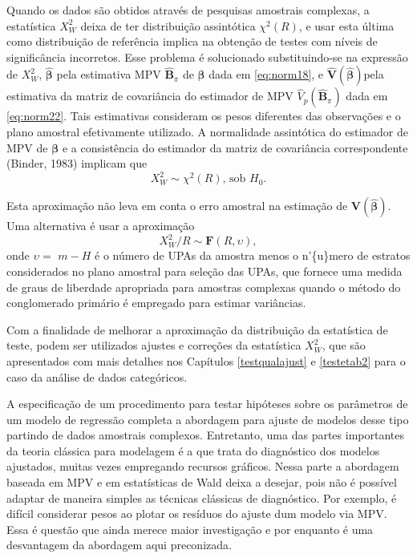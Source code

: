 \documentclass[]{book}
\theoremstyle{definition}
\theoremstyle{definition}
\theoremstyle{definition}
\theoremstyle{remark}
\begin{document}
Quando os dados são obtidos através de pesquisas amostrais complexas, a
estatística \(X_{W}^{2}\) deixa de ter distribuição assintótica
\(\chi ^{2}\left( R\right)\), e usar esta última como distribuição de
referência implica na obtenção de testes com níveis de significância
incorretos. Esse problema é solucionado substituindo-se na expressão de
\(X_{W}^{2}\), \(\mathbf{\hat{\beta}}\) pela estimativa MPV
\(\widehat{\mathbf{B}}_{\pi }\) de \(\mathbf{\beta}\) dada em
\eqref{eq:norm18}, e
\(\widehat{\mathbf{V}}\left( \mathbf{\hat{\beta}}\right)\)pela
estimativa da matriz de covariância do estimador de MPV
\(\hat{V}_{p}\left( \widehat{\mathbf{B}}_{\pi }\right)\) dada em
\eqref{eq:norm22}. Tais estimativas consideram os pesos diferentes das
observações e o plano amostral efetivamente utilizado. A normalidade
assintótica do estimador de MPV de \(\mathbf{\beta}\) e a consistência
do estimador da matriz de covariância correspondente (Binder, 1983)
implicam que \[
X_{W}^{2}\sim \chi^{2}\left( R\right)\mbox{, sob }H_{0}.
\]

Esta aproximação não leva em conta o erro amostral na estimação de
\(\mathbf{V}\left( \mathbf{\hat{\beta}}\right) .\) Uma alternativa é
usar a aproximação \[
X_{W}^{2}/R\sim \mathbf{F}(R,\upsilon),
\] onde \(\upsilon =\) \(m-H\) é o número de UPAs da amostra menos o
n'\{u\}mero de estratos considerados no plano amostral para seleção das
UPAs, que fornece uma medida de graus de liberdade apropriada para
amostras complexas quando o método do conglomerado primário é empregado
para estimar variâncias.

Com a finalidade de melhorar a aproximação da distribuição da
estatística de teste, podem ser utilizados ajustes e correções da
estatística \(X_{W}^{2}\), que são apresentados com mais detalhes nos
Capítulos \ref{testqualajust} e \ref{testetab2} para o caso da análise
de dados categóricos.

A especificação de um procedimento para testar hipóteses sobre os
parâmetros de um modelo de regressão completa a abordagem para ajuste de
modelos desse tipo partindo de dados amostrais complexos. Entretanto,
uma das partes importantes da teoria clássica para modelagem é a que
trata do diagnóstico dos modelos ajustados, muitas vezes empregando
recursos gráficos. Nessa parte a abordagem baseada em MPV e em
estatísticas de Wald deixa a desejar, pois não é possível adaptar de
maneira simples as técnicas clássicas de diagnóstico. Por exemplo, é
difícil considerar pesos ao plotar os resíduos do ajuste dum modelo via
MPV. Essa é questão que ainda merece maior investigação e por enquanto é
uma desvantagem da abordagem aqui preconizada.
\end{document}
